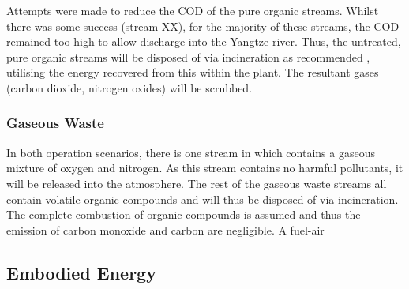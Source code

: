 

Attempts were made to reduce the COD of the pure organic streams. Whilst there was some success (stream XX), for the majority of these streams, the COD remained too high to allow discharge into the Yangtze river. Thus, the untreated, pure organic streams will be disposed of via incineration as recommended \cite{sinnott_coulson_2005}, utilising the energy recovered from this within the plant. The resultant gases (carbon dioxide, nitrogen oxides) will be scrubbed. 




\subsubsection{Gaseous Waste}

In both operation scenarios, there is one stream in which contains a gaseous mixture of oxygen and nitrogen. As this stream contains no harmful pollutants, it will be released into the atmosphere. The rest of the gaseous waste streams all contain volatile organic compounds and will thus be disposed of via incineration. The complete combustion of organic compounds is assumed and thus the emission of carbon monoxide and carbon are negligible. A fuel-air 



\subsection{Embodied Energy}